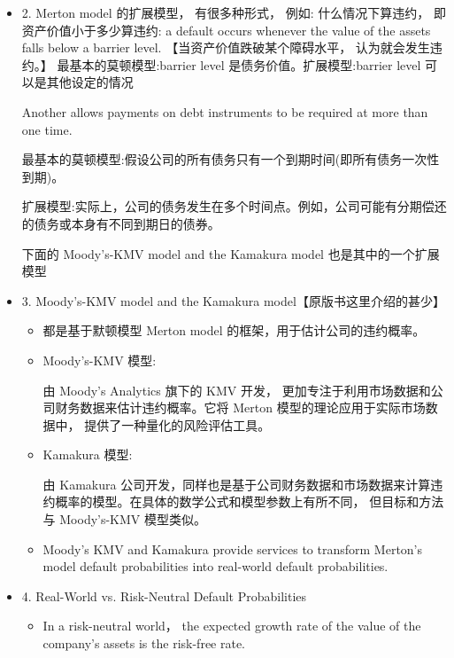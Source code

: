\begin{itemize}
\begin{itemize}
\end{itemize}


\item 2. Merton model 的扩展模型， 有很多种形式， 例如:
什么情况下算违约， 即资产价值小于多少算违约: a default occurs whenever the value of the assets falls below a barrier level. 【当资产价值跌破某个障碍水平， 认为就会发生违约。】
最基本的莫顿模型:barrier level 是债务价值。扩展模型:barrier level 可以是其他设定的情况

Another allows payments on debt instruments to be required at more than one time.

最基本的莫顿模型:假设公司的所有债务只有一个到期时间(即所有债务一次性到期)。

扩展模型:实际上，公司的债务发生在多个时间点。例如，公司可能有分期偿还的债务或本身有不同到期日的债券。

 下面的 Moody's-KMV model and the Kamakura model 也是其中的一个扩展模型

 \item 3. Moody's-KMV model and the Kamakura model【原版书这里介绍的甚少】
\begin{itemize}

    \item 都是基于默顿模型 Merton model 的框架，用于估计公司的违约概率。

    \item Moody's-KMV 模型:

由 Moody's Analytics 旗下的 KMV 开发， 更加专注于利用市场数据和公司财务数据来估计违约概率。它将 Merton 模型的理论应用于实际市场数据中， 提供了一种量化的风险评估工具。


\item Kamakura 模型:

由 Kamakura 公司开发，同样也是基于公司财务数据和市场数据来计算违约概率的模型。在具体的数学公式和模型参数上有所不同， 但目标和方法与 Moody's-KMV 模型类似。

\item Moody's KMV and Kamakura provide services to transform Merton's model default probabilities into real-world default probabilities.
\end{itemize}

\item 4. Real-World vs. Risk-Neutral Default Probabilities

\begin{itemize}
\item In a risk-neutral world， the expected growth rate of the value of the company's assets is the risk-free rate.


\end{itemize}
\end{itemize}
